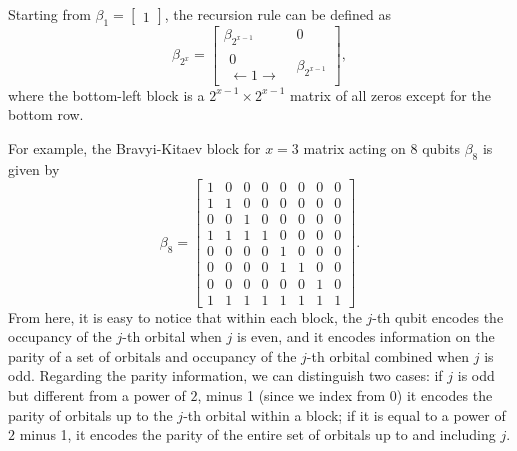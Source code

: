 Starting from  $\beta_1 = \left[\begin{array}{c} 1 \end{array}\right]$, the recursion rule can be defined as 
\begin{equation}
\label{eq:bravyikitaev2}
\beta_{2^x} =\left[\begin{array}{c|c}
\beta_{2^{x-1}} & 0 \\
\hline \begin{array}{c} 0 \\ \leftarrow 1 \rightarrow \end{array} & \beta_{2^{x-1}}
\end{array}\right],
\end{equation}
where the bottom-left block is a $2^{x-1} \times 2^{x-1}$ matrix of all zeros except for the bottom row.

For example, the Bravyi-Kitaev block for $x = 3$ matrix acting on $8$ qubits $\beta_8$ is given by
\begin{equation}
\beta_8 = \left[\begin{array}{llllllll}
1 & 0 & 0 & 0 & 0 & 0 & 0 & 0 \\
1 & 1 & 0 & 0 & 0 & 0 & 0 & 0 \\
0 & 0 & 1 & 0 & 0 & 0 & 0 & 0 \\
1 & 1 & 1 & 1 & 0 & 0 & 0 & 0 \\
0 & 0 & 0 & 0 & 1 & 0 & 0 & 0 \\
0 & 0 & 0 & 0 & 1 & 1 & 0 & 0 \\
0 & 0 & 0 & 0 & 0 & 0 & 1 & 0 \\
1 & 1 & 1 & 1 & 1 & 1 & 1 & 1
\end{array}\right].
\end{equation}
From here, it is easy to notice that within each block, the $j$-th qubit encodes the occupancy of the $j$-th orbital when $j$ is even, and it encodes information on the parity of a set of orbitals and occupancy of the $j$-th orbital combined when $j$ is odd. Regarding the parity information, we can distinguish two cases: if $j$ is odd but different from a power of $2$, minus 1 (since we index from $0$) it encodes the parity of orbitals up to the $j$-th orbital within a block; if it is equal to a power of $2$ minus 1, it encodes the parity of the entire set of orbitals up to and including $j$. 

